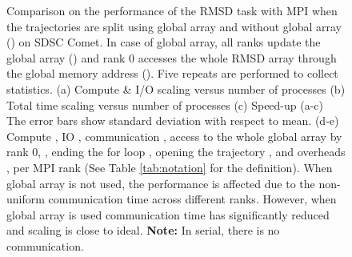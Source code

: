 \begin{figure}[ht!]
\caption{Comparison on the performance of the RMSD task with MPI when the trajectories are split using global array and without global array () on SDSC Comet.
In case of global array, all ranks update the global array () and rank 0 accesses the whole RMSD array through the global memory address ().
Five repeats are performed to collect statistics. (a) Compute \& I/O scaling versus number of processes (b) Total time scaling versus number of processes (c) Speed-up (a-c) The error bars show standard deviation with respect to mean. (d-e) Compute \tcomp, IO \tIO, communication \tcomm, access to the whole global array by rank 0, , ending the for loop , 
opening the trajectory , and overheads ,  per MPI rank (See Table \ref{tab:notation} for the definition). When global array is not used, the performance is affected due to the non-uniform communication time across different ranks. However, when global array is used communication time has significantly reduced and scaling is close to ideal. \textbf{Note:} In serial, there is no communication.}
\label{fig:MPIwithIO-split}
\end{figure}

